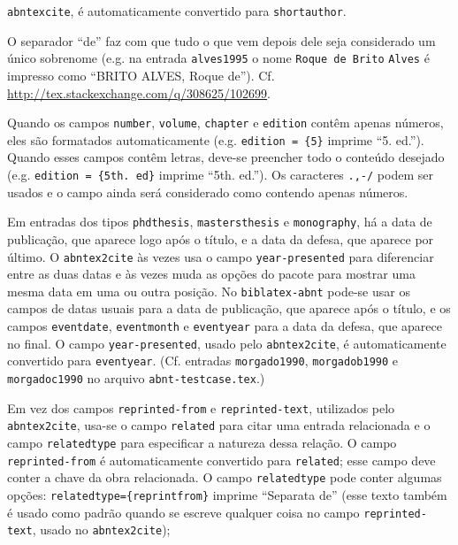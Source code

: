 \documentclass[a4paper]{article}
\begin{document}
\begin{itemize}
\begin{sloppypar}
    \texttt{abntex\-cite}, é automaticamente convertido para
    \texttt{shortauthor}.
  \item O separador ``de'' faz com que tudo o que vem depois dele seja
    considerado um único sobrenome (e.g. na entrada \texttt{alves1995} o nome
    \texttt{Roque de Brito} \texttt{Alves} é impresso como ``BRITO ALVES,
    Roque de''). Cf. \url{http://tex.stackexchange.com/q/308625/102699}.
  \item Quando os campos \texttt{number}, \texttt{volume}, \texttt{chapter} e
    \texttt{edition} contêm apenas números, eles são formatados
    automaticamente (e.g. \texttt{edition = \{5\}} imprime ``5. ed.''). Quando
    esses campos contêm letras, deve-se preencher todo o conteúdo desejado
    (e.g. \verb"edition = {5th. ed}" imprime ``5th. ed.''). Os caracteres
    \texttt{.,-/} podem ser usados e o campo ainda será considerado como
    contendo apenas números.
  \item Em entradas dos tipos \texttt{phdthesis}, \texttt{mastersthesis} e
    \texttt{monography}, há a data de publicação, que aparece logo após o
    título, e a data da defesa, que aparece por último. O
    \texttt{abntex2cite}
    às vezes usa o campo \texttt{year-presented} para diferenciar entre as
    duas
    datas e às vezes muda as opções do pacote para mostrar uma mesma data
    em
    uma ou outra posição. No \texttt{biblatex-abnt} pode-se usar os campos
    de
    datas usuais para a data de publicação, que aparece após o título, e
    os campos \texttt{eventdate}, \texttt{eventmonth} e \texttt{eventyear}
    para a
    data da defesa, que aparece no final. O campo \texttt{year-presented},
    usado pelo \texttt{abntex2cite}, é automaticamente convertido para
    \texttt{eventyear}. (Cf. entradas \texttt{morgado1990},
    \texttt{morgadob1990} e \texttt{morgadoc1990} no arquivo
    \texttt{abnt-testcase.tex}.)
  \item Em vez dos campos \texttt{reprinted-from} e \texttt{reprinted-text},
    utilizados pelo \texttt{abntex2cite}, usa-se o campo \texttt{related} para
    citar uma entrada relacionada e o campo \texttt{relatedtype} para
    especificar a natureza dessa relação. O campo \texttt{reprinted-from} é
    automaticamente convertido para \texttt{related}; esse campo deve conter a
    chave da obra relacionada. O campo \texttt{relatedtype} pode conter
    algumas
    opções: \texttt{relatedtype=\{reprintfrom\}} imprime ``Separata de''
    (esse texto também é usado como padrão quando se escreve qualquer coisa
    no campo \texttt{reprinted-text}, usado no \texttt{abntex2cite});

\end{sloppypar}
\end{itemize}
\end{document}
